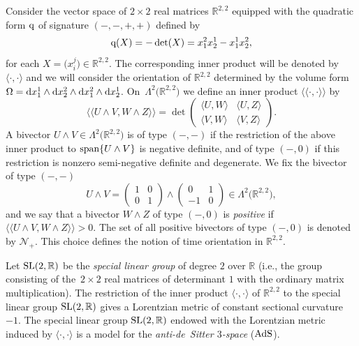 \documentclass[pdftex]{sigma}
\numberwithin{equation}{section}
\def\R{\mathbb{R}}
\def\SL{{\rm SL}(2,\R)}
\def\AdS{{\rm AdS}}
\begin{document}
Consider the vector space of $2\times 2$ real matrices $\R^{2,2}$ equipped with the quadratic form ${\rm q}$ of signature $(-,-,+,+)$ defined by
\begin{equation*}{\rm q}(X)=-\det (X)=x_1^2x_2^1-x_1^1x_2^2,\end{equation*}
for each $X=\bigl(x_i^j\bigr)\in\R^{2,2}$. The corresponding inner product will be denoted by $\langle\cdot,\cdot\rangle$ and we will consider the orientation of $\R^{2,2}$ determined by the volume form $\Omega={\rm d} x_1^1\wedge {\rm d} x_2^2\wedge {\rm d} x_1^2\wedge {\rm d} x_2^1$. On~$\Lambda^2\bigl(\R^{2,2}\bigr)$ we define an inner product $\langle\langle\cdot,\cdot\rangle\rangle$ by
\begin{equation*}\langle\langle U\wedge V,W\wedge Z\rangle\rangle=\det \begin{pmatrix} \langle U,W\rangle & \langle U,Z\rangle \\ \langle V,W\rangle & \langle V,Z\rangle \end{pmatrix}.\end{equation*}
A bivector $U\wedge V\in\Lambda^2\bigl(\R^{2,2}\bigr)$ is of type $(-,-)$ if the restriction of the above inner product to ${\rm span}\{U\wedge V\}$ is negative definite, and of type $(-,0)$ if this restriction is nonzero semi-negative definite and degenerate. We fix the bivector of type $(-,-)$
\begin{equation*}U\wedge V=\begin{pmatrix} 1 & 0 \\ 0 & 1 \end{pmatrix}\wedge\begin{pmatrix} 0 & 1 \\ -1 & 0 \end{pmatrix}\in\Lambda^2\bigl(\R^{2,2}\bigr),\end{equation*}
and we say that a bivector $W\wedge Z$ of type $(-,0)$ is \emph{positive} if $\langle\langle U\wedge V,W\wedge Z\rangle\rangle>0$. The set of all positive bivectors of type $(-,0)$ is denoted by $\mathcal{N}_+$.
This choice defines the notion of time orientation in $\R^{2,2}$.

Let $\SL$ be the \emph{special linear group} of degree $2$ over $\R$ (i.e.,
the group consisting of the~${2\times 2}$ real matrices of determinant $1$ with the ordinary matrix multiplication). The restriction of the inner product $\langle\cdot,\cdot\rangle$ of $\R^{2,2}$ to the special linear group $\SL$ gives a Lorentzian metric of constant sectional curvature $-1$. The special linear group $\SL$ endowed with the Lorentzian metric induced by $\langle\cdot,\cdot\rangle$ is a model for the \emph{anti-de~Sitter $3$-space} ($\AdS$).
\end{document}
